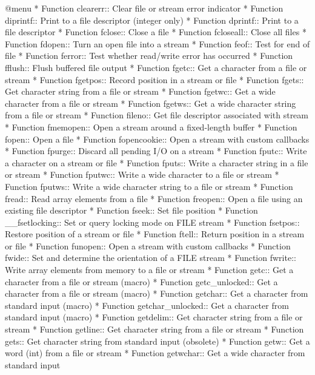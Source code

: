 @menu
* Function clearerr::    Clear file or stream error indicator
* Function diprintf::    Print to a file descriptor (integer only)
* Function dprintf::     Print to a file descriptor
* Function fclose::      Close a file
* Function fcloseall::   Close all files
* Function fdopen::      Turn an open file into a stream
* Function feof::        Test for end of file
* Function ferror::      Test whether read/write error has occurred
* Function fflush::      Flush buffered file output
* Function fgetc::       Get a character from a file or stream
* Function fgetpos::     Record position in a stream or file
* Function fgets::       Get character string from a file or stream
* Function fgetwc::      Get a wide character from a file or stream
* Function fgetws::      Get a wide character string from a file or stream
* Function fileno::      Get file descriptor associated with stream
* Function fmemopen::    Open a stream around a fixed-length buffer
* Function fopen::       Open a file
* Function fopencookie:: Open a stream with custom callbacks
* Function fpurge::      Discard all pending I/O on a stream
* Function fputc::       Write a character on a stream or file
* Function fputs::       Write a character string in a file or stream
* Function fputwc::      Write a wide character to a file or stream
* Function fputws::      Write a wide character string to a file or stream
* Function fread::       Read array elements from a file
* Function freopen::     Open a file using an existing file descriptor
* Function fseek::       Set file position
* Function __fsetlocking::	Set or query locking mode on FILE stream
* Function fsetpos::     Restore position of a stream or file
* Function ftell::       Return position in a stream or file
* Function funopen::     Open a stream with custom callbacks
* Function fwide::       Set and determine the orientation of a FILE stream
* Function fwrite::      Write array elements from memory to a file or stream
* Function getc::        Get a character from a file or stream (macro)
* Function getc_unlocked::	Get a character from a file or stream (macro)
* Function getchar::     Get a character from standard input (macro)
* Function getchar_unlocked::	Get a character from standard input (macro)
* Function getdelim::    Get character string from a file or stream
* Function getline::     Get character string from a file or stream
* Function gets::        Get character string from standard input (obsolete)
* Function getw::        Get a word (int) from a file or stream
* Function getwchar::    Get a wide character from standard input

